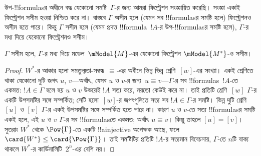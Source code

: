 \documentclass[../../../include/open-logic-section]{subfiles}
\begin{document}


উপ-!!{formula}sর অধীনে বদ্ধ যেকোনো সমষ্টি~$\Gamma$-র জন্য আমরা ফিল্ট্রেশন সংজ্ঞায়িত করেছি। সংজ্ঞা একাই ফিল্ট্রেশন সসীম হওয়া নিশ্চিত করে না। বাস্তবে $\Gamma$ অসীম হলে (যেমন সব !!{formula}sর সমষ্টি হলে) ফিল্ট্রেশনও অসীম হতে পারে। কিন্তু $\Gamma$ সসীম হলে (যেমন প্রদত্ত !!{formula}~$!A$-র উপ-!!{formula}sর সমষ্টি হলে), $\Gamma$-র মধ্য দিয়ে যেকোনো ফিল্ট্রেশনও সসীম।

\begin{prop}
  $\Gamma$ সসীম হলে, $\Gamma$-র মধ্য দিয়ে মডেল~$\mModel{M}$-এর যেকোনো ফিল্ট্রেশন $\mModel{M^*}$-ও সসীম।
\end{prop}

\begin{proof}
  $W^*$-র আকার হলো সমতুল্যতা-সম্বন্ধ~$\equiv$-এর অধীনে ভিন্ন ভিন্ন শ্রেণি~$[w]$-এর সংখ্যা। একই শ্রেণিতে থাকা যেকোনো দুটি জগৎ $u$, $v$—অর্থাৎ, যেসব $u$ ও $v$-র জন্য~$u \equiv v$—$\Gamma$-র সব !!{formula}s~$!A$-তে একমত: $!A \in \Gamma$ হলে হয় $u$ ও $v$ উভয়েই $!A$ সত্য করে, নয়তো কেউই করে না। তাই প্রতিটি শ্রেণি~$[w]$ $\Gamma$-র একটি উপসমষ্টির সঙ্গে সম্পর্কিত; সেটি হলো~$[w]$-র জগৎগুলিতে সত্য সব $!A \in
  \Gamma$-র সমষ্টি। ভিন্ন দুটি শ্রেণি $[u]$ ও $[v]$ $\Gamma$-র একই উপসমষ্টির সঙ্গে সম্পর্কিত হতে পারে না। কারণ $u$ ও $v$-তে সত্য !!{formula}sর সমষ্টি একই হলে, এই $u$ ও $v$ $\Gamma$-র সব !!{formula}sতে একমত; অর্থাৎ $u \equiv v$। কিন্তু তাহলে $[u] = [v]$। সুতরাং $W^*$ থেকে $\Pow{\Gamma}$-তে একটি !!a{injective} অপেক্ষক আছে, ফলে $\card{W^*} \le \card{\Pow{\Gamma}}$। তাই সমষ্টিটির প্রতিটি $!A$-র সত্যমান বিবেচনায়, $\Gamma$-তে $n$টি বাক্য থাকলে $W^*$-র কার্ডিনালিটি~$2^n$-এর বেশি নয়।
\end{proof}
\end{document}
